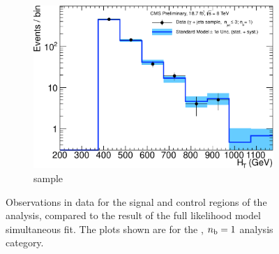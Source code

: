 \begin{figure}[h!]
\begin{subfigure}[b]{0.48\textwidth}
    \includegraphics[width=\textwidth]
    {Figs/results/v0/blueBand/single_plots/photon_1b_le3j_logy.pdf}
    \caption{\gj sample}
  \end{subfigure}
  \caption{Observations in data for the signal and control
  regions of the analysis, compared to the result of the full likelihood model
  simultaneous fit. The plots shown are for the \njlow, $n_{\text{b}} = 1$ analysis category.}
  \label{fig:blue_fits_1b_le3j}
\end{figure}

